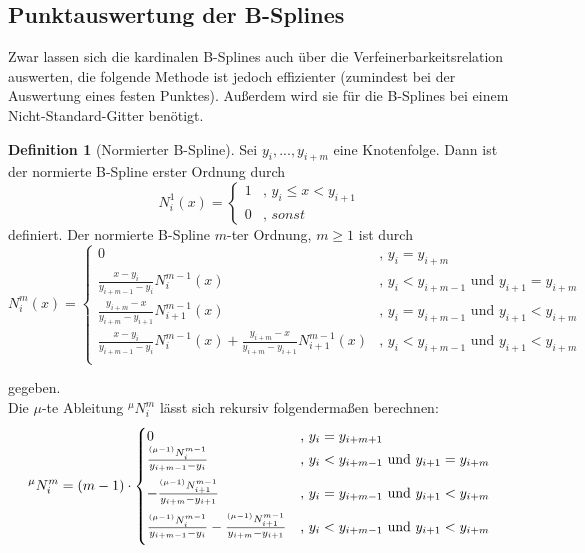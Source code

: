 \documentclass[11pt,a4paper,titlepage]{article}
\theoremstyle{plain} %
\theoremstyle{definition} %
\newtheorem{definition}[satz]{Definition}
\numberwithin{equation}{section} %
\begin{document}
	\subsection{Punktauswertung der B-Splines}
	Zwar lassen sich die kardinalen B-Splines auch über die Verfeinerbarkeitsrelation auswerten, die folgende Methode ist jedoch effizienter (zumindest bei der Auswertung eines festen Punktes). Außerdem wird sie für die B-Splines bei einem Nicht-Standard-Gitter benötigt.
	 \begin{definition}[Normierter B-Spline]
	 	Sei $y_i, ... , y_{i + m}$ eine Knotenfolge. Dann ist der normierte B-Spline erster Ordnung
	 	durch
	 	\begin{equation}
	 		N_i^1(x) = \begin{cases}
	 			1 &\mbox{, } y_i \leq x < y_{i + 1} \\
	 			0 & \mbox{, } sonst
	 		\end{cases}
	 	\end{equation}
	 	definiert.
	 	Der normierte B-Spline $m$-ter Ordnung, $m \geq 1$ ist durch
	 	\begin{equation}
	 		N_i^m (x) = \begin{cases} 			
	 			0 & \mbox{, } y_i=y_{i+m} \\
	 			\frac{x - y_i}{y_{i + m - 1} - y_i} N_i^{m - 1} (x)	  	&\mbox{, } y_i<y_{i+m-1} \text{ und } y_{i+1}=y_{i+m}  \\
	 			\frac{y_{ i + m} - x}{y_{i + m} - y_{i + 1}} N_{i + 1}^{m - 1} (x)  	&\mbox{, } y_i=y_{i+m-1}  \text{ und } y_{i+1}<y_{i+m}  \\
	 			\frac{x - y_i}{y_{i + m - 1} - y_i} N_i^{m - 1} (x)	+\frac{y_{ i + m} - x}{y_{i + m} - y_{i + 1}} N_{i + 1}^{m - 1} (x)  		&\mbox{, } y_i<y_{i+m-1}  \text{ und } y_{i+1}<y_{i+m}  \\
	 		\end{cases}
	 	\end{equation}
	 \end{definition}
	 
	 gegeben.\\
	 Die $\mu$-te Ableitung $^\mu N_i^m$ lässt sich rekursiv folgendermaßen berechnen:
	 \begin{equation}
		 ^\mu N_i^m = (m-1) \cdot \begin{cases}
			 0 &\mbox{, } y_i=y_{i+m+1}\\
			 \vspace*{0.2cm}
			 \frac{^{(\mu-1)}N_i^{m-1}}{y_{i+m-1}-y_i} & \mbox{, }  y_i<y_{i+m-1} \text{ und } y_{i+1}=y_{i+m}  \\
			  \vspace*{0.2cm}
			 -\frac{^{(\mu-1)}N_{i+1}^{m-1}}{y_{i+m}-y_{i+1}} & \mbox{, } 	y_i=y_{i+m-1}  \text{ und } y_{i+1}<y_{i+m}  \\
			  \vspace*{0.2cm}
			 \frac{^{(\mu-1)}N_i^{m-1}}{y_{i+m-1}-y_i}-\frac{^{(\mu-1)}N_{i+1}^{m-1}}{y_{i+m}-y_{i+1}}	&\mbox{, } y_i<y_{i+m-1}  \text{ und } y_{i+1}<y_{i+m}  \\	 
		 \end{cases}
	 \end{equation}
	
\end{document}
